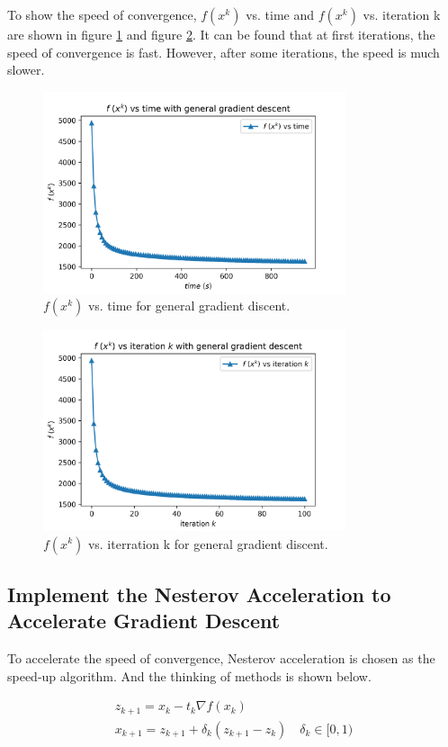 \documentclass{article}
\begin{document}
To show the speed of convergence, $f(x^{k})$ vs. time and  $f(x^{k})$ vs. iteration k are shown in figure \ref{img8} and figure \ref{img9}. It can be found that at first iterations, the speed of convergence is fast. However, after some iterations, the speed is much slower.

\begin{figure}[h]
  \includegraphics[width=3.5in]{pic8.png}
  \centering
  \caption{$f(x^{k})$ vs. time for general gradient discent.}
  \label{img8}
\end{figure}

\begin{figure}[h]
  \includegraphics[width=3.5in]{pic9.png}
  \centering
  \caption{$f(x^{k})$ vs. iterration k for general gradient discent.}
  \label{img9}
\end{figure}


\subsection{Implement the Nesterov Acceleration to Accelerate Gradient Descent}

To accelerate the speed of convergence, Nesterov acceleration is chosen as the speed-up algorithm. And the thinking of methods is shown below.

$$
\begin{array}{l}
z_{k+1}=x_{k}-t_{k} \nabla f\left(x_{k}\right) \\
x_{k+1}=z_{k+1}+\delta_{k}\left(z_{k+1}-z_{k}\right) \quad \delta_{k} \in[0,1)
\end{array}
$$
\end{document}
